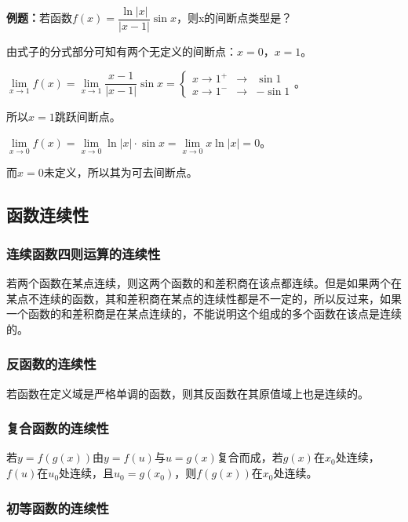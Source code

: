 \documentclass[UTF8, 12pt]{ctexart}
\begin{document}
    \textbf{例题：}若函数$f(x)=\dfrac{\ln\vert x\vert}{\vert x-1\vert}\sin x$，则x的间断点类型是？\medskip

    由式子的分式部分可知有两个无定义的间断点：$x=0$，$x=1$。\medskip

    $\lim\limits_{x\to 1}f(x)=\lim\limits_{x\to 1}\dfrac{x-1}{\vert x-1\vert}\sin x=\left\{
    \begin{array}{lcl}
        x\to 1^+ & \rightarrow & \sin 1  \\
        x\to 1^- & \rightarrow & -\sin 1
    \end{array} \right.
    $。

    所以$x=1$跳跃间断点。

    $\lim\limits_{x\to 0}f(x)=\lim\limits_{x\to 0}\ln\vert x\vert\cdot\sin x=\lim\limits_{x\to 0}x\ln\vert x\vert=0$。

    而$x=0$未定义，所以其为可去间断点。

    \subsection{函数连续性}

    \subsubsection{连续函数四则运算的连续性}

    若两个函数在某点连续，则这两个函数的和差积商在该点都连续。但是如果两个在某点不连续的函数，其和差积商在某点的连续性都是不一定的，所以反过来，如果一个函数的和差积商是在某点连续的，不能说明这个组成的多个函数在该点是连续的。

    \subsubsection{反函数的连续性}

    若函数在定义域是严格单调的函数，则其反函数在其原值域上也是连续的。

    \subsubsection{复合函数的连续性}

    若$y=f(g(x))$由$y=f(u)$与$u=g(x)$复合而成，若$g(x)$在$x_0$处连续，$f(u)$在$u_0$处连续，且$u_0=g(x_0)$，则$f(g(x))$在$x_0$处连续。

    \subsubsection{初等函数的连续性}
\end{document}
